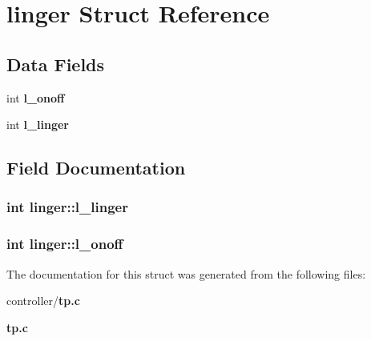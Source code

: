 \section{linger Struct Reference}
\label{structlinger}
\subsection*{Data Fields}
\begin{DoxyCompactItemize}
\item 
int {\bf l\_\-onoff}
\item 
int {\bf l\_\-linger}
\end{DoxyCompactItemize}


\subsection{Field Documentation}
\subsubsection[{l\_\-linger}]{\setlength{\rightskip}{0pt plus 5cm}int {\bf linger::l\_\-linger}}\label{structlinger_a2b7d01c9a43f95d2ba6f6cf0ec68b412}
\subsubsection[{l\_\-onoff}]{\setlength{\rightskip}{0pt plus 5cm}int {\bf linger::l\_\-onoff}}\label{structlinger_aa917aeadf061af6ed64aad87df3255fc}


The documentation for this struct was generated from the following files:\begin{DoxyCompactItemize}
\item 
controller/{\bf tp.c}\item 
{\bf tp.c}\end{DoxyCompactItemize}
